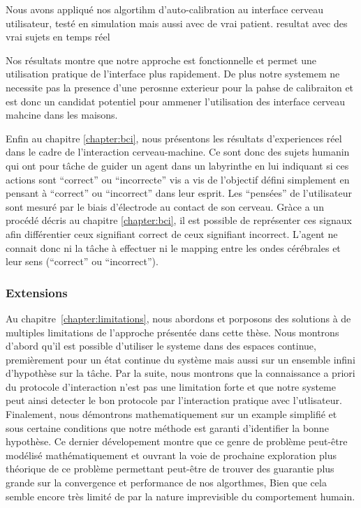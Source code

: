 Nous avons appliqué nos algortihm d'auto-calibration au interface cerveau utilisateur, testé en simulation mais aussi avec de vrai patient. resultat avec des vrai sujets en temps réel

Nos résultats montre que notre approche est fonctionnelle et permet une utilisation pratique  de l'interface plus rapidement. De plus notre systemem ne necessite pas la presence d'une perosnne exterieur pour la pahse de calibraiton et est donc un candidat potentiel pour ammener l'utilisation des interface cerveau mahcine dans les maisons.

Enfin au chapitre \ref{chapter:bci}, nous présentons les résultats d'experiences réel dans le cadre de l'interaction cerveau-machine. Ce sont donc des sujets humanin qui ont pour tâche de guider un agent dans un labyrinthe en lui indiquant si ces actions sont ``correct''  ou ``incorrecte'' vis a vis de l'objectif défini simplement en pensant à ``correct'' ou ``incorrect'' dans leur esprit. Les ``pensées'' de l'utilisateur sont mesuré par le biais d'électrode au contact de son cerveau. Gràce a un procédé décris au chapitre \ref{chapter:bci}, il est possible de représenter ces signaux afin différentier ceux signifiant correct de ceux signifiant incorrect. L'agent ne connait donc ni la tâche à effectuer ni le mapping entre les ondes cérébrales et leur sens (``correct'' ou ``incorrect'').

\subsubsection*{Extensions}

Au chapitre~\ref{chapter:limitations}, nous abordons et porposons des solutions à de multiples limitations de l'approche présentée dans cette thèse. Nous montrons d'abord qu'il est possible d'utiliser le systeme dans des espaces continue, premièrement pour un état continue du système mais aussi sur un ensemble infini d'hypothèse sur la tâche. Par la suite, nous montrons que la connaissance a priori du protocole d'interaction  n'est pas une limitation forte et que notre systeme peut ainsi detecter le bon protocole par l'interaction pratique avec l'utlisateur. Finalement, nous démontrons mathematiquement sur un example simplifié et sous certaine conditions que notre méthode est garanti d'identifier la bonne hypothèse. Ce dernier dévelopement montre que ce genre de problème peut-être modélisé mathématiquement et ouvrant la voie de prochaine exploration plus théorique de ce problème permettant peut-être de trouver des  guarantie plus grande sur la convergence et performance de nos algorthmes, Bien que cela semble encore très limité de par la nature imprevisible du comportement humain.

